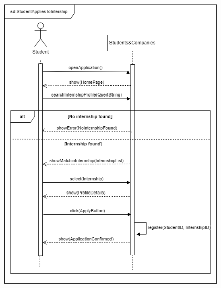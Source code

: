 \documentclass{article}
\begin{document}
\begin{figure}[H]
    \centering
    \includegraphics[scale = 0.45]{figures/UseCasesSD/StudentAppliesToIntershipSD.drawio (1).png}
\end{figure}
\end{document}
